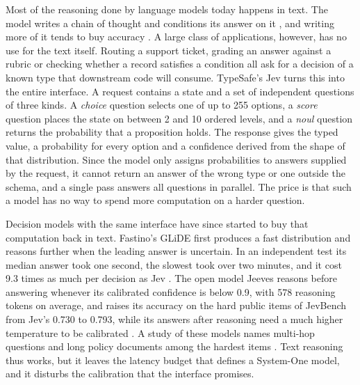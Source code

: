 \documentclass{article}
\begin{document}
Most of the reasoning done by language models today happens in text. The model writes a chain of thought and conditions its answer on it \cite{wei2022chain}, and writing more of it tends to buy accuracy \cite{snell2024scaling}. A large class of applications, however, has no use for the text itself. Routing a support ticket, grading an answer against a rubric or checking whether a record satisfies a condition all ask for a decision of a known type that downstream code will consume. TypeSafe's Jev \cite{typesafe2026jev, typesafe2026docs} turns this into the entire interface. A request contains a state and a set of independent questions of three kinds. A \emph{choice} question selects one of up to 255 options, a \emph{score} question places the state on between 2 and 10 ordered levels, and a \emph{noul} question returns the probability that a proposition holds. The response gives the typed value, a probability for every option and a confidence derived from the shape of that distribution. Since the model only assigns probabilities to answers supplied by the request, it cannot return an answer of the wrong type or one outside the schema, and a single pass answers all questions in parallel. The price is that such a model has no way to spend more computation on a harder question.

Decision models with the same interface have since started to buy that computation back in text. Fastino's GLiDE first produces a fast distribution and reasons further when the leading answer is uncertain. In an independent test its median answer took one second, the slowest took over two minutes, and it cost 9.3 times as much per decision as Jev \cite{anthus2026glide}. The open model Jeeves reasons before answering whenever its calibrated confidence is below 0.9, with 578 reasoning tokens on average, and raises its accuracy on the hard public items of JevBench from Jev's 0.730 to 0.793, while its answers after reasoning need a much higher temperature to be calibrated \cite{posthog2026jeeves}. A study of these models names multi-hop questions and long policy documents among the hardest items \cite{li2026llmasjev}. Text reasoning thus works, but it leaves the latency budget that defines a System-One model, and it disturbs the calibration that the interface promises.
\end{document}
